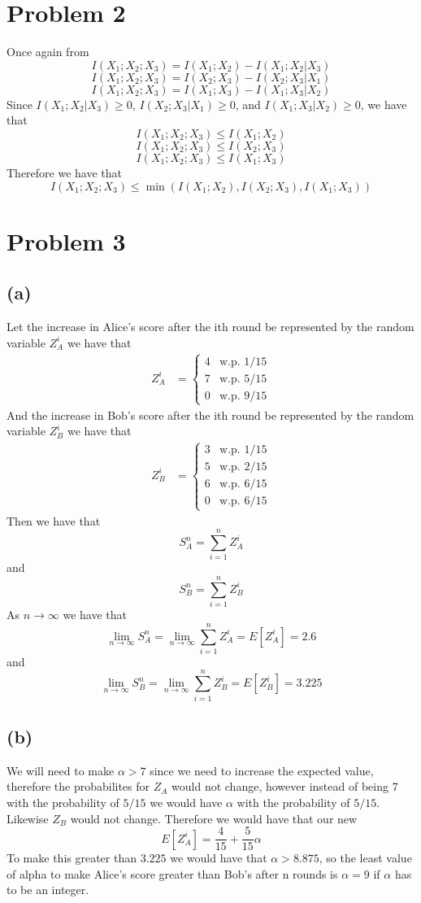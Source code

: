\section*{Problem 2}
Once again from 
$$I(X_1;X_2;X_3)=I(X_1;X_2)-I(X_1;X_2|X_3)$$
$$I(X_1;X_2;X_3)=I(X_2;X_3)-I(X_2;X_3|X_1)$$
$$I(X_1;X_2;X_3)=I(X_1;X_3)-I(X_1;X_3|X_2)$$
Since $I(X_1;X_2|X_3)\geq0$, $I(X_2;X_3|X_1)\geq0$, and $I(X_1;X_3|X_2)\geq0$, we have that
$$I(X_1;X_2;X_3)\leq I(X_1;X_2)$$
$$I(X_1;X_2;X_3)\leq I(X_2;X_3)$$
$$I(X_1;X_2;X_3)\leq I(X_1;X_3)$$
Therefore we have that
$$I(X_1;X_2;X_3)\leq\min(I(X_1;X_2),I(X_2;X_3),I(X_1;X_3))$$
\section*{Problem 3}
\subsection*{(a)}
Let the increase in Alice's score after the ith round be 
represented by the random variable $Z_A^i$ we have that
\begin{align*}
    Z_A^i&=\begin{cases}
        4 & \text{w.p. } 1/15\\
        7 & \text{w.p. } 5/15\\
        0 & \text{w.p. } 9/15
    \end{cases}
\end{align*}
And the increase in Bob's score after the ith round be
represented by the random variable $Z_B^i$ we have that
\begin{align*}
    Z_B^i&=\begin{cases}
        3 & \text{w.p. } 1/15\\
        5 & \text{w.p. } 2/15\\
        6 & \text{w.p. } 6/15\\
        0 & \text{w.p. } 6/15
    \end{cases}
\end{align*}
Then we have that 
$$S_A^n=\sum_{i=1}^n Z_A^i$$
and
$$S_B^n=\sum_{i=1}^n Z_B^i$$
As $n\to\infty$ we have that
$$\lim_{n\to\infty}S_A^n=\lim_{n\to\infty}\sum_{i=1}^n Z_A^i=E[Z_A^i]=\boxed{2.6}$$
and
$$\lim_{n\to\infty}S_B^n=\lim_{n\to\infty}\sum_{i=1}^n Z_B^i=E[Z_B^i]=\boxed{3.225}$$
\subsection*{(b)}
We will need to make $\alpha>7$ since we need to increase the expected value,
therefore the probabilites for $Z_A$ would not change, however instead 
of being 7 with the probability of $5/15$ we would have $\alpha$ with the
probability of $5/15$. Likewise $Z_B$ would not change. Therefore we would have that
our new 
$$E[Z_A^i]=\frac{4}{15}+\frac{5}{15}\alpha$$
To make this greater than $3.225$ we would have that
$\alpha>8.875$, so the least value of alpha to make Alice's
score greater than Bob's after n rounds is $\boxed{\alpha=9}$ if $\alpha$ has
to be an integer. 

